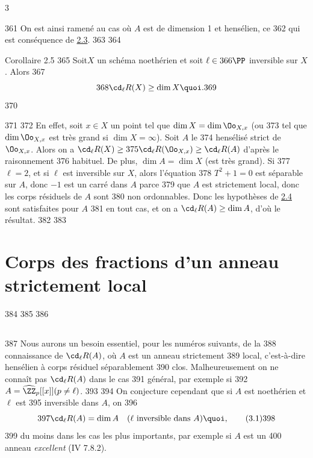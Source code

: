 3	\documentclass[10pt]{../fichiers-configuration-latex/smfart}
\begin{document}
   361	On est ainsi ramené au cas où $A$ est de dimension 1 et hensélien, ce
   362	qui est conséquence de \hyperref[X.thm2.3]{2.3}.
   363	
   364	\begin{enonce*}{Corollaire 2.5}
   365	Soit\pageoriginale $X$ un schéma noethérien et soit $\ell\in
   366	\PP$ inversible sur $X$. Alors
   367	$$
   368	\cd_{\ell}R(X)\geq \dim X{\quoi}.
   369	$$
   370	\end{enonce*}
   371	
   372	En effet, soit $x\in X$ un point tel que $\dim X=\dim \Oo_{X,x}$ (ou
   373	tel que $\dim \Oo_{X,x}$ est très grand si $\dim X=\infty$). Soit $A$ le
   374	hensélisé strict de $\Oo_{X,x}$. Alors on a $\cd_{\ell}R(X)\geq
   375	\cd_{\ell}R(\Oo_{X,x})\geq \cd_{\ell}R(A)$ d'après le raisonnement
   376	habituel. De plus, $\dim A=\dim X$ (\resp est très grand). Si
   377	$\ell=2$, et si $\ell$ est inversible sur $X$, alors l'équation
   378	$T^2+1=0$ est séparable sur $A$, donc $-1$ est un carré dans $A$ parce
   379	que $A$ est strictement local, donc les corps résiduels de $A$ sont
   380	non ordonnables. Donc les hypothèses de \hyperref[X.cor2.4]{2.4} sont satisfaites pour $A$
   381	en tout cas, et on a $\cd_{\ell}R(A)\geq \dim A$, d'où le résultat.
   382	
   383	\section{Corps des fractions d'un anneau strictement local}
   384	
   385	\setcounter{subsection}{-1}
   386	\subsection{}
   387	Nous aurons un besoin essentiel, pour les numéros suivants, de la
   388	connaissance de $\cd_{\ell}R(A)$, où $A$ est un anneau strictement
   389	local, c'est-à-dire hensélien à corps résiduel séparablement
   390	clos. Malheureusement on ne connaît pas $\cd_{\ell}R(A)$ dans le cas
   391	général, par exemple si
   392	$A=\widehat{\ZZ}_p[[x]](p\neq \ell)$.
   393	
   394	On conjecture cependant que si $A$ est noethérien et $\ell$ est
   395	inversible dans $A$, on 
   396	\begin{equation*}
   397	\cd_{\ell}R(A)=\dim A\quad (\ell\mbox{ inversible dans } A){\quoi},\tag{3.1}
   398	\end{equation*}
   399	du moins dans les cas les plus importants, par exemple si $A$ est un
   400	anneau \emph{excellent} (\EGA IV 7.8.2).
\end{document}
